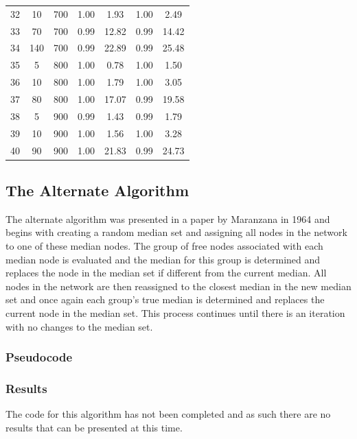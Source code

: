 \documentclass[11pt]{article}
\begin{document}
\begin{table}[]
\begin{tabular}{ccccccc}
			\rowcolor[HTML]{EFEFEF} 
			32 & 10 & 700 & 1.00 & 1.93 & 1.00 & 2.49 \\
			\rowcolor[HTML]{EFEFEF} 
			33 & 70 & 700 & 0.99 & 12.82 & 0.99 & 14.42 \\
			\rowcolor[HTML]{EFEFEF} 
			34 & 140 & 700 & 0.99 & 22.89 & 0.99 & 25.48 \\
			35 & 5 & 800 & 1.00 & 0.78 & 1.00 & 1.50 \\
			36 & 10 & 800 & 1.00 & 1.79 & 1.00 & 3.05 \\
			37 & 80 & 800 & 1.00 & 17.07 & 0.99 & 19.58 \\
			\rowcolor[HTML]{EFEFEF} 
			38 & 5 & 900 & 0.99 & 1.43 & 0.99 & 1.79 \\
			\rowcolor[HTML]{EFEFEF} 
			39 & 10 & 900 & 1.00 & 1.56 & 1.00 & 3.28 \\
			\rowcolor[HTML]{EFEFEF} 
			40 & 90 & 900 & 1.00 & 21.83 & 0.99 & 24.73
		\end{tabular}
	\end{table}
	
	
	\subsection{The Alternate Algorithm} \label{alternatealgo}
	The alternate algorithm was presented in a paper by Maranzana  in 1964 \cite{MARA64} and begins with creating a random median set and assigning all nodes in the network to one of these median nodes.  The group of free nodes associated with each median node is evaluated and the median for this group is determined and replaces the node in the median set if different from the current median.  All nodes in the network are then reassigned to the closest median in the new median set and once again each group's true median is determined and replaces the current node in the median set.  This process continues until there is an iteration with no changes to the median set.
	
	\subsubsection{Pseudocode}

	\subsubsection{Results}
	The code for this algorithm has not been completed and as such there are no results that can be presented at this time.
	
\end{document}
